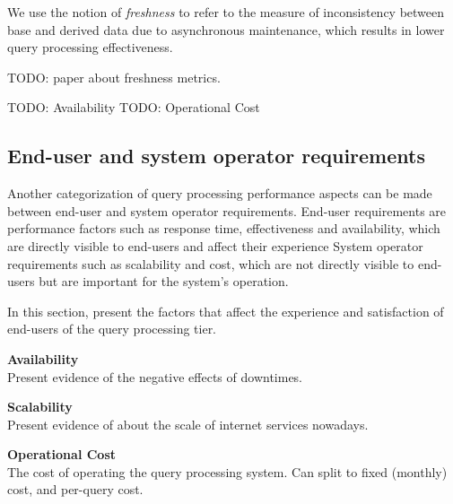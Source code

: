 We use the notion of \textit{freshness} to refer to the measure of inconsistency between base and derived data due to
asynchronous maintenance, which results in lower query processing effectiveness.

TODO: paper about freshness metrics.

TODO: Availability
TODO: Operational Cost


\subsection{End-user and system operator requirements}

Another categorization of query processing performance aspects can be made between end-user and system operator
requirements.
End-user requirements are performance factors such as response time, effectiveness and availability, which are directly
visible to end-users and affect their experience
System operator requirements such as scalability and cost, which are not directly visible to end-users but are important
for the system's operation.


In this section, present the factors that affect the experience and satisfaction of end-users of the query processing
tier.




\textbf{Availability} \\
  Present evidence of the negative effects of downtimes.



\textbf{Scalability} \\
Present evidence of about the scale of internet services nowadays.

\textbf{Operational Cost} \\
The cost of operating the query processing system. Can split to fixed (monthly) cost, and per-query cost.


